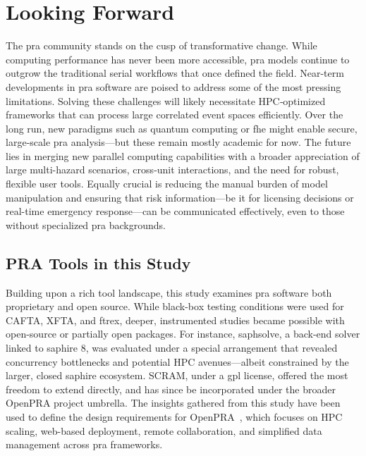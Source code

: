 \section{Looking Forward}
The \acrshort{pra} community stands on the cusp of transformative change. While computing performance has never been more accessible, \acrshort{pra} models continue to outgrow the traditional serial workflows that once defined the field. Near-term developments in \acrshort{pra} software are poised to address some of the most pressing limitations. Solving these challenges will likely necessitate HPC‐optimized frameworks that can process large correlated event spaces efficiently. Over the long run, new paradigms such as quantum computing or \acrfull{fhe} might enable secure, large‐scale \acrshort{pra} analysis—but these remain mostly academic for now. The future lies in merging new parallel computing capabilities with a broader appreciation of large multi-hazard scenarios, cross‐unit interactions, and the need for robust, flexible user tools. Equally crucial is reducing the manual burden of model manipulation and ensuring that risk information—be it for licensing decisions or real-time emergency response—can be communicated effectively, even to those without specialized \acrshort{pra} backgrounds.

\subsection*{PRA Tools in this Study}

Building upon a rich tool landscape, this study examines \acrshort{pra} software both proprietary and open source. While black-box testing conditions were used for CAFTA, XFTA, and \acrshort{ftrex}, deeper, instrumented studies became possible with open-source or partially open packages. For instance, \acrshort{saphsolve}, a back-end solver linked to \acrshort{saphire} 8, was evaluated under a special arrangement that revealed concurrency bottlenecks and potential HPC avenues—albeit constrained by the larger, closed \acrshort{saphire} ecosystem. SCRAM, under a \acrshort{gpl} license, offered the most freedom to extend directly, and has since be incorporated under the broader OpenPRA project umbrella. The insights gathered from this study have been used to define the design requirements for OpenPRA~\cite{openpra_initiative_openpra_2024}, which focuses on HPC scaling, web-based deployment, remote collaboration, and simplified data management across \acrshort{pra} frameworks.



